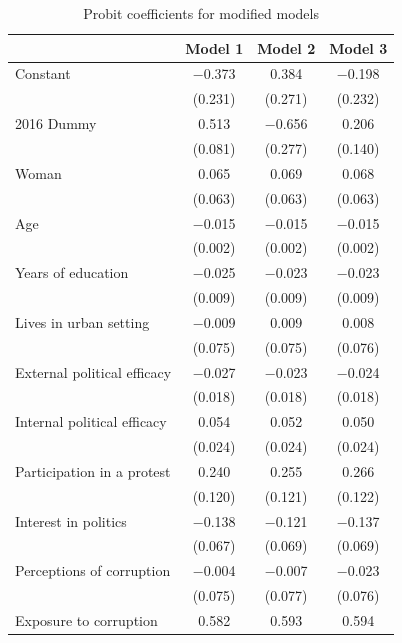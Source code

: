 \documentclass[12pt,a4]{article}\usepackage[]{graphicx}\usepackage[]{xcolor}
\begin{document}
\begin{table}[htbp]
\begin{center}
\caption{Probit coefficients for modified models}
\label{tab:complexmodprob}

\begin{tabular}[t]{lccc}
\toprule
  & Model 1 & Model 2 & Model 3\\
\midrule
Constant & \num{-0.373} & \num{0.384} & \num{-0.198}\\
 & (\num{0.231}) & (\num{0.271}) & (\num{0.232})\\
2016 Dummy & \num{0.513} & \num{-0.656} & \num{0.206}\\
 & (\num{0.081}) & (\num{0.277}) & (\num{0.140})\\
Woman & \num{0.065} & \num{0.069} & \num{0.068}\\
 & (\num{0.063}) & (\num{0.063}) & (\num{0.063})\\
Age & \num{-0.015} & \num{-0.015} & \num{-0.015}\\
 & (\num{0.002}) & (\num{0.002}) & (\num{0.002})\\
Years of education & \num{-0.025} & \num{-0.023} & \num{-0.023}\\
 & (\num{0.009}) & (\num{0.009}) & (\num{0.009})\\
Lives in urban setting & \num{-0.009} & \num{0.009} & \num{0.008}\\
 & (\num{0.075}) & (\num{0.075}) & (\num{0.076})\\
External political efficacy & \num{-0.027} & \num{-0.023} & \num{-0.024}\\
 & (\num{0.018}) & (\num{0.018}) & (\num{0.018})\\
Internal political efficacy & \num{0.054} & \num{0.052} & \num{0.050}\\
 & (\num{0.024}) & (\num{0.024}) & (\num{0.024})\\
Participation in a protest & \num{0.240} & \num{0.255} & \num{0.266}\\
 & (\num{0.120}) & (\num{0.121}) & (\num{0.122})\\
Interest in politics & \num{-0.138} & \num{-0.121} & \num{-0.137}\\
 & (\num{0.067}) & (\num{0.069}) & (\num{0.069})\\
Perceptions of corruption & \num{-0.004} & \num{-0.007} & \num{-0.023}\\
 & (\num{0.075}) & (\num{0.077}) & (\num{0.076})\\
Exposure to corruption & \num{0.582} & \num{0.593} & \num{0.594}\\

\end{tabular}
\end{center}
\end{table}
\end{document}
